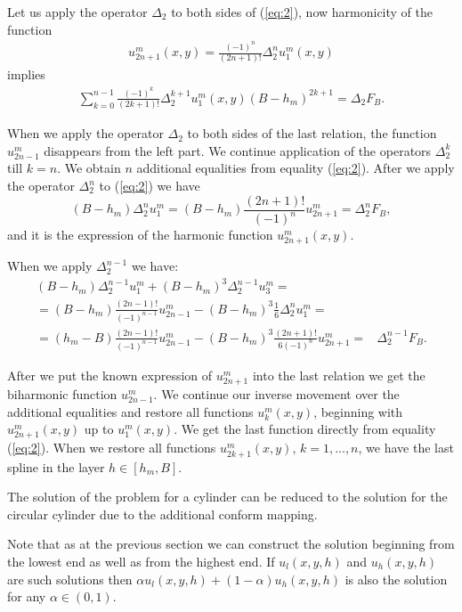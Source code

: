 \documentclass{amsart}
\begin{document}
Let us apply the operator $\Delta_2$ to both sides of (\ref{eq:2}),
now harmonicity of the function
\begin{eqnarray}
u^m_{2 n+1}(x,y)=\frac{(-1)^{n}}{(2n+1)!}\Delta^{n}_2
u^m_1(x,y)\nonumber
\end{eqnarray}
implies
\begin{eqnarray}
\sum\limits_{k=0}^{n-1}\frac{(-1)^{k}}{(2k+1)!} \Delta_2^{k+1}
u^m_1(x,y) (B-h_m)^{2 k+1}=\Delta_2 F_B.\nonumber
\end{eqnarray}

When we apply the operator {\bf $\Delta_2$} to both sides of the
last relation, the function $u^m_{2 n-1}$ disappears from the left
part. We continue application of the operators $\Delta^k_2$ till
$k=n$. We obtain $n$ additional equalities from equality
(\ref{eq:2}). After we apply the operator  $\Delta^n_2$ to
(\ref{eq:2}) we have
$$
(B-h_m)\Delta_2^{n} u^m_1=(B-h_m)\frac{(2n+1)!}{(-1)^n} u^m_{2 n
+1}=\Delta_2^{n} F_B,\nonumber
$$
and it is the expression of the harmonic function $u^m_{2
n+1}(x,y)$.

When we apply $\Delta^{n-1}_2$ we have:
\begin{eqnarray}
(B-h_m) \Delta_2^{n-1} u_1^m+(B-h_m)^3\Delta_2^{n-1} u_3^m= & \nonumber \\
=(B-h_m)\frac{(2n-1)!}{(-1)^{n-1}}u_{2 n-1}^m-(B-h_m)^3\frac{1}{6}
\Delta_2^n u_1^m= & \nonumber \\
=(h_m-B)\frac{(2n-1)!}{(-1)^{n-1}}u_{2
n-1}^m-(B-h_m)^3\frac{(2n+1)!}{6 (-1)^n} u_{2n+1}^m= &
\Delta_2^{n-1} F_B.\nonumber
\end{eqnarray}

After we put the known expression of $u_{2n+1}^m$ into the last
relation  we get the biharmonic function $u^{m}_{2 n -1}$. We
continue our inverse movement over the additional equalities and
restore all functions  $u_k^m(x,y)$, beginning with
$u_{2n+1}^m(x,y)$ up to $u_1^m(x,y)$. We get the last function
directly from equality (\ref{eq:2}). When we restore all functions
$u_{2 k+1}^m(x,y)$, $k=1,...,n$, we have the last spline in the
layer $h \in [h_m,B]$.

The solution of the problem for a cylinder can be reduced to the
solution for the circular cylinder due to the additional conform
mapping.

Note that as at the previous section we can construct the solution
beginning from the lowest end as well as from the highest end. If
$u_l(x,y,h)$ and $u_h(x,y,h)$ are such solutions then $\alpha
u_l(x,y,h)+(1-\alpha) u_h(x,y,h)$ is also the solution for any
$\alpha \in(0,1)$.
\end{document}
